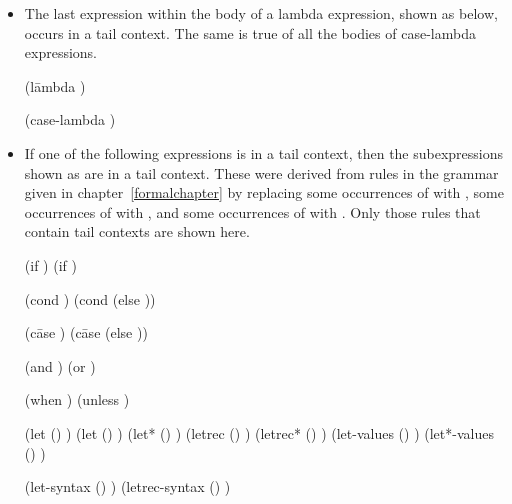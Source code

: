 \begin{itemize}
\item The last expression within the body of a lambda expression,
  shown as  below, occurs in a tail context.
  The same is true of all the bodies of {\cf case-lambda} expressions.
\begin{grammar}%
(l\=ambda 
  \>  )

(case-lambda )
\end{grammar}%

\item If one of the following expressions is in a tail context,
then the subexpressions shown as  are in a tail context.
These were derived from rules in the grammar given in
chapter~\ref{formalchapter} by replacing some occurrences of 
with ,  some occurrences of 
with ,  and some occurrences of 
with .  Only those rules that contain tail contexts
are shown here.

\begin{grammar}%
(if   )
(if  )

(cond )
(cond  (else ))

(c\=ase 
  \>)
(c\=ase 
  \>
  \>(else ))

(and  )
(or  )

(when  )
(unless  )

(let () )
(let  () )
(let* () )
(letrec () )
(letrec* () )
(let-values () )
(let*-values () )

(let-syntax () )
(letrec-syntax () )


\end{grammar}
\end{itemize}
